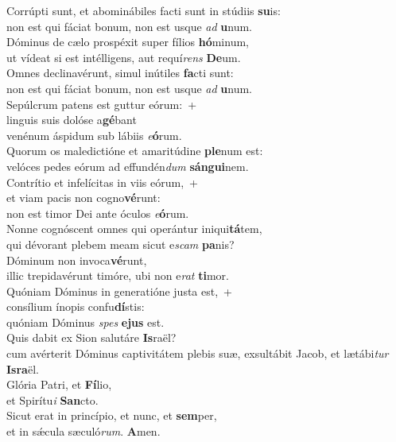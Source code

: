 \evenverse Corrúpti sunt, et abominábiles facti sunt in stúdiis \textbf{su}is:~\*\\
\evenverse non est qui fáciat bonum, non est usque \textit{ad} \textbf{u}num.\\
\oddverse Dóminus de cælo prospéxit super fílios \textbf{hó}minum,~\*\\
\oddverse ut vídeat si est intélligens, aut requí\textit{rens} \textbf{De}um.\\
\evenverse Omnes declinavérunt, simul inútiles \textbf{fa}cti sunt:~\*\\
\evenverse non est qui fáciat bonum, non est usque \textit{ad} \textbf{u}num.\\
\oddverse Sepúlcrum patens est guttur eórum:~+\\
\oddverse  linguis suis dolóse a\textbf{gé}bant~\*\\
\oddverse venénum áspidum sub lábiis \textit{e}\textbf{ó}rum.\\
\evenverse Quorum os maledictióne et amaritúdine \textbf{ple}num est:~\*\\
\evenverse velóces pedes eórum ad effundén\textit{dum} \textbf{sán}\textbf{gui}nem.\\
\oddverse Contrítio et infelícitas in viis eórum,~+\\
\oddverse  et viam pacis non cogno\textbf{vé}runt:~\*\\
\oddverse non est timor Dei ante óculos \textit{e}\textbf{ó}rum.\\
\evenverse Nonne cognóscent omnes qui operántur iniqui\textbf{tá}tem,~\*\\
\evenverse qui dévorant plebem meam sicut e\textit{scam} \textbf{pa}nis?\\
\oddverse Dóminum non invoca\textbf{vé}runt,~\*\\
\oddverse illic trepidavérunt timóre, ubi non e\textit{rat} \textbf{ti}mor.\\
\evenverse Quóniam Dóminus in generatióne justa est,~+\\
\evenverse  consílium ínopis confu\textbf{dí}stis:~\*\\
\evenverse quóniam Dóminus \textit{spes} \textbf{e}\textbf{jus} est.\\
\oddverse Quis dabit ex Sion salutáre \textbf{Is}raël?~\*\\
\oddverse cum avérterit Dóminus captivitátem plebis suæ, exsultábit Jacob, et lætábi\textit{tur} \textbf{Is}\textbf{ra}ël.\\
\evenverse Glória Patri, et \textbf{Fí}lio,~\*\\
\evenverse et Spirítu\textit{i} \textbf{San}cto.\\
\oddverse Sicut erat in princípio, et nunc, et \textbf{sem}per,~\*\\
\oddverse et in sǽcula sæculó\textit{rum}. \textbf{A}men.\\
